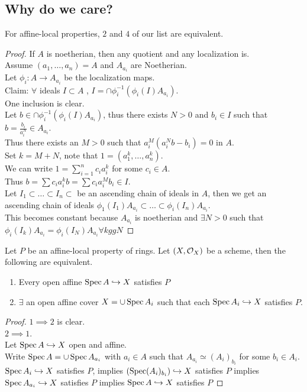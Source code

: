 \documentclass[../main.tex]{subfiles}
\begin{document}
\subsection*{Why do we care?}
For affine-local properties, $2$ and $4$ of our list are equivalent.
\begin{proof}
If $A$ is noetherian, then any quotient and any localization is.\\
Assume $( a_1,\ldots,a_n) = A$ and $A_{a_i} $ are Noetherian.\\
Let $\phi_i:A\to A_{a_i} $ be the localization maps.\\
Claim: $\forall$ ideals $I \subset A$ , $I = \cap \phi_i ^{-1}( \phi_i( I) A_{a_i} ) $.\\
One inclusion is clear.\\
Let $b \in \cap \phi_i^{-1}( \phi_i( I) A_{a_i} ) $, thus there exists $N >0$ and $b_i \in I$ such that $ b= \frac{b_i}{a_i ^{N}}\in A_{a_i} $.\\
Thus there exists an $M>0$ such that $a_i^{M}( a_i^{N}b - b_i) = 0$ in $A$.\\
Set $k= M+N$, note that $1= ( a_1^{k},\ldots,a_n^{k}) $.\\
We can write $1= \sum_{i=1}^{ n} c_i a_i^{k}$ for some $c_i \in A$.\\
Thus $b = \sum c_i a_i^{k}b= \sum c_i a_i^{M}b_i\in I$.\\
Let $I_1 \subset \ldots \subset I_n \subset $ be an ascending chain of ideals in $A$, then we get an ascending chain of ideals $\phi_1( I_1) A_{a_i} \subset \ldots \subset \phi_i( I_n) A_{a_i} $.\\
This becomes constant because $A_{a_i} $ is noetherian and $\exists N >0$ such that $\phi_i( I_k) A_{a_i} = \phi_i ( I_N) A_{a_i} \forall kggN$ 
\end{proof}
\begin{lemma}
Let $P$ be an affine-local property of rings. Let $( X,\mathcal{O}_X) $ be a scheme, then the following are equivalent.
\begin{enumerate}
\item Every open affine $\operatorname{Spec} A \hookrightarrow X$ satisfies $P$ 
\item $\exists$ an open affine cover $X= \cup \operatorname{Spec} A_i$ such that each $\operatorname{Spec} A_i \hookrightarrow X$ satisfies $P$.
\end{enumerate}
\end{lemma}
\begin{proof}
$1\implies 2$ is clear.\\
$2\implies 1$.\\
Let $\operatorname{Spec} A \hookrightarrow  X$ open and affine.\\
Write $\operatorname{Spec} A = \cup \operatorname{Spec} A_{a_i} $ with $a_i \in A$ such that $A_{a_i} \simeq ( A_i)_{b_i} $ for some $b_i \in A_i$.\\
$\operatorname{Spec} A_i \hookrightarrow X$ satisfies $P$, implies $( \operatorname{Spec}(  A_i ) _{b_i}) \hookrightarrow X $ satisfies $P$ implies $\operatorname{Spec} A_{a_i} \hookrightarrow X$ satisfies $P$ implies $\operatorname{Spec} A \hookrightarrow X$ satisfies $P$
\end{proof}
\end{document}
